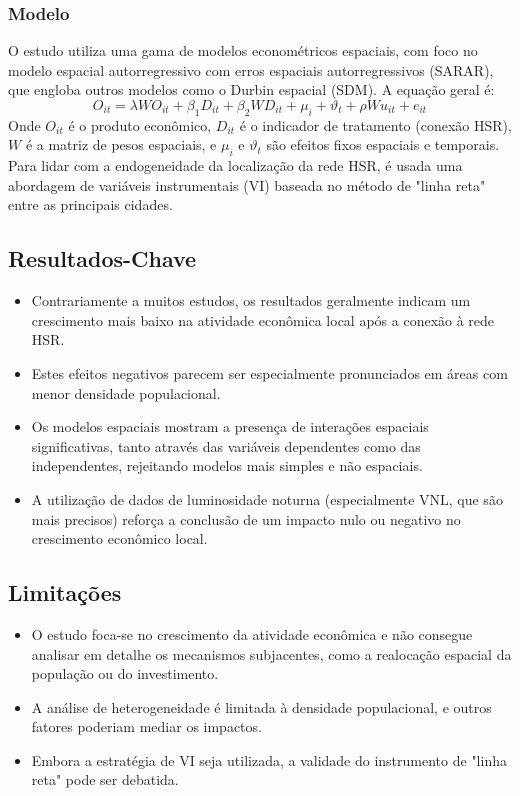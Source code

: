 \documentclass[12pt]{article}
\begin{document}
\subsubsection*{Modelo}
O estudo utiliza uma gama de modelos econométricos espaciais, com foco no modelo espacial autorregressivo com erros espaciais autorregressivos (SARAR), que engloba outros modelos como o Durbin espacial (SDM). A equação geral é:
\begin{equation*}
O_{it} = \lambda W O_{it} + \beta_1 D_{it} + \beta_2 W D_{it} + \mu_i + \vartheta_t + \rho W u_{it} + e_{it}
\end{equation*}
Onde $O_{it}$ é o produto econômico, $D_{it}$ é o indicador de tratamento (conexão HSR), $W$ é a matriz de pesos espaciais, e $\mu_i$ e $\vartheta_t$ são efeitos fixos espaciais e temporais. Para lidar com a endogeneidade da localização da rede HSR, é usada uma abordagem de variáveis instrumentais (VI) baseada no método de "linha reta" entre as principais cidades.

\subsection*{Resultados-Chave}
\begin{itemize}
    \item Contrariamente a muitos estudos, os resultados geralmente indicam um crescimento mais baixo na atividade econômica local após a conexão à rede HSR.
    \item Estes efeitos negativos parecem ser especialmente pronunciados em áreas com menor densidade populacional.
    \item Os modelos espaciais mostram a presença de interações espaciais significativas, tanto através das variáveis dependentes como das independentes, rejeitando modelos mais simples e não espaciais.
    \item A utilização de dados de luminosidade noturna (especialmente VNL, que são mais precisos) reforça a conclusão de um impacto nulo ou negativo no crescimento econômico local.
\end{itemize}

\subsection*{Limitações}
\begin{itemize}
    \item O estudo foca-se no crescimento da atividade econômica e não consegue analisar em detalhe os mecanismos subjacentes, como a realocação espacial da população ou do investimento.
    \item A análise de heterogeneidade é limitada à densidade populacional, e outros fatores poderiam mediar os impactos.
    \item Embora a estratégia de VI seja utilizada, a validade do instrumento de "linha reta" pode ser debatida.
\end{itemize}
\end{document}

